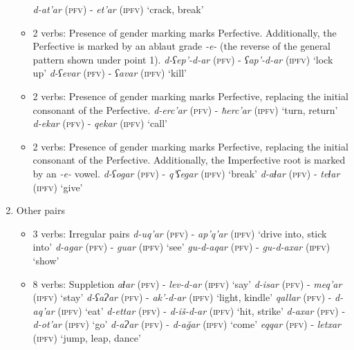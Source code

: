 \begin{enumerate}
\begin{itemize}
		\subitem \textit{d-at'ar} (\textsc{pfv}) - \textit{et'ar} (\textsc{ipfv}) `crack, break'
		\item 2 verbs: Presence of gender marking marks Perfective. Additionally, the Perfective is marked by an ablaut grade \textit{-e-} (the reverse of the general pattern shown under point 1).
		\subitem \textit{d-ʕep'-d-ar} (\textsc{pfv}) - \textit{ʕap'-d-ar} (\textsc{ipfv}) `lock up'
		\subitem \textit{d-ʕevar} (\textsc{pfv}) - \textit{ʕavar} (\textsc{ipfv}) `kill'
		\item 2 verbs: Presence of gender marking marks Perfective, replacing the initial consonant of the Perfective. 
		\subitem \textit{d-erc'ar} (\textsc{pfv}) - \textit{ħerc'ar} (\textsc{ipfv}) `turn, return'
		\subitem \textit{d-ekar} (\textsc{pfv}) - \textit{qekar} (\textsc{ipfv}) `call'
		\item 2 verbs: Presence of gender marking marks Perfective, replacing the initial consonant of the Perfective. Additionally, the Imperfective root is marked by an \textit{-e-} vowel.
		\subitem \textit{d-ʕogar} (\textsc{pfv}) - \textit{q'ʕegar} (\textsc{ipfv}) `break'
		\subitem \textit{d-aɬar} (\textsc{pfv}) - \textit{teɬar} (\textsc{ipfv}) `give'
		
	\end{itemize}
	\item Other pairs
	\begin{itemize}
		\item 3 verbs: Irregular pairs
		\subitem \textit{d-uq'ar} (\textsc{pfv}) - \textit{ap'q'ar} (\textsc{ipfv}) `drive into, stick into'
		\subitem \textit{d-agar} (\textsc{pfv}) - \textit{guar} (\textsc{ipfv}) `see'
		\subitem \textit{gu-d-aqar} (\textsc{pfv}) - \textit{gu-d-axar} (\textsc{ipfv}) `show'
		\item 8 verbs: Suppletion
        \subitem \textit{aɬar} (\textsc{pfv}) - \textit{lev-d-ar} (\textsc{ipfv}) `say'
		\subitem \textit{d-isar} (\textsc{pfv}) - \textit{meq'ar} (\textsc{ipfv}) `stay'
		\subitem \textit{d-ʕaɁar} (\textsc{pfv}) - \textit{ak'-d-ar} (\textsc{ipfv}) `light, kindle'
		\subitem \textit{qallar} (\textsc{pfv}) - \textit{d-aq'ar} (\textsc{ipfv}) `eat'
		\subitem \textit{d-ettar} (\textsc{pfv}) - \textit{d-iš-d-ar} (\textsc{ipfv}) `hit, strike'
		\subitem \textit{d-axar} (\textsc{pfv}) - \textit{d-ot'ar} (\textsc{ipfv}) `go'
		\subitem \textit{d-aɁar} (\textsc{pfv}) - \textit{d-a\u{g}ar} (\textsc{ipfv}) `come'
		\subitem \textit{eqqar} (\textsc{pfv}) - \textit{letxar} (\textsc{ipfv}) `jump, leap, dance' 
		
		
	\end{itemize}
\end{enumerate}


